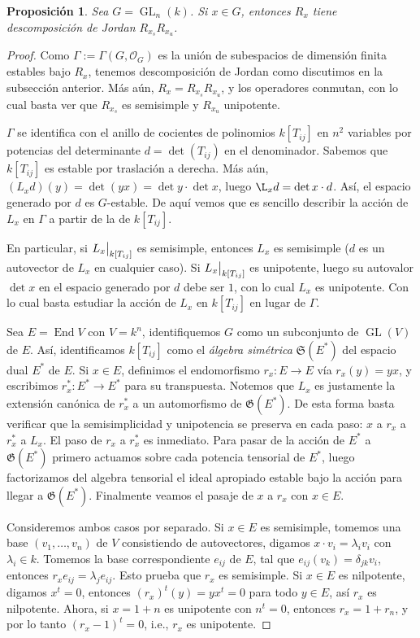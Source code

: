 \documentclass[spanish,10pt]{amsart}
\newtheorem{proposition}[theorem]{Proposición}
\theoremstyle{definition}
\theoremstyle{remark}
\numberwithin{equation}{section}
\newcommand\rest[2]{{%
  \left.\kern-\nulldelimiterspace %
  #1 %
  \vphantom{\big|} %
  \right|_{#2} %
  }}
\renewcommand{\O}{\mathcal{O}}
\begin{document}
\begin{proposition}
Sea $G = \operatorname{GL}_n (k)$. Si $x \in G$, entonces $R_x$ tiene descomposición de Jordan $R_{x_s} R_{x_u}$.
\end{proposition}

\begin{proof}
Como $\Gamma := \Gamma (G, \O_G)$ es la unión de subespacios de dimensión finita estables bajo $R_x$, tenemos descomposición de Jordan como discutimos en la subsección anterior. Más aún, $R_x = R_{x_s} R_{x_u}$, y los operadores conmutan, con lo cual basta ver que $R_{x_s}$ es semisimple y $R_{x_u}$ unipotente.

$\Gamma$ se identifica con el anillo de cocientes de polinomios $k[T_{ij}]$ en $n^2$ variables por potencias del determinante $d = \det (T_{ij})$ en el denominador. Sabemos que $k[T_{ij}]$ es estable por traslación a derecha. Más aún, $(L_x d) (y) = \det (y x) = \det y \cdot \det x$, luego $\L_x d = \det x \cdot d$. Así, el espacio generado por $d$ es $G$-estable. De aquí vemos que es sencillo describir la acción de $L_x$ en $\Gamma$ a partir de la de $k[T_{ij}]$.

En particular, si $\rest{L_x}{k[T_{ij}]}$ es semisimple, entonces $L_x$ es semisimple ($d$ es un autovector de $L_x$ en cualquier caso). Si $\rest{L_x}{k[T_{ij}]}$ es unipotente, luego su autovalor $\det x$ en el espacio generado por $d$ debe ser $1$, con lo cual $L_x$ es unipotente. Con lo cual basta estudiar la acción de $L_x$ en $k[T_{ij}]$ en lugar de $\Gamma$.

Sea $E = \operatorname{End} V$ con $V = k^n$, identifiquemos $G$ como un subconjunto de $\operatorname{GL}(V)$ de $E$. Así, identificamos $k[T_{ij}]$ como el \textit{álgebra simétrica} $\mathfrak S (E^*)$ del espacio dual $E^*$ de $E$. Si $x \in E$, definimos el endomorfismo $r_x : E \to E$ vía $r_{x} (y) = y x$, y escribimos $r_x^* : E^* \to E^*$ para su transpuesta. Notemos que $L_x$ es justamente la extensión canónica de $r_x^*$ a un automorfismo de $\mathfrak G (E^*)$. De esta forma basta verificar que la semisimplicidad y unipotencia se preserva en cada paso: $x$ a $r_x$ a $r_x^*$ a $L_x$. El paso de $r_x$ a $r_x^*$ es inmediato. Para pasar de la acción de $E^*$ a $\mathfrak G (E^*)$ primero actuamos sobre cada potencia tensorial de $E^*$, luego factorizamos del algebra tensorial el ideal apropiado estable bajo la acción para llegar a $\mathfrak G (E^*)$. Finalmente veamos el pasaje de $x$ a $r_x$ con $x \in E$.

Consideremos ambos casos por separado. Si $ x\in E$ es semisimple, tomemos una base $(v_1, \ldots, v_n)$ de $V$ consistiendo de autovectores, digamos $x \cdot v_i = \lambda_i v_i$ con $\lambda_i \in k$. Tomemos la base correspondiente $e_{ij}$ de $E$, tal que $e_{ij} (v_k) = \delta_{jk} v_i$, entonces $r_x e_{ij} = \lambda_j e_{ij}$. Esto prueba que $r_x$ es semisimple. Si $x \in E$ es nilpotente, digamos $x^t = 0$, entonces $(r_x)^t (y) = y x^t = 0$ para todo $y \in E$, así $r_x$ es nilpotente. Ahora, si $x = 1 + n$ es unipotente con $n^t = 0$, entonces $r_x = 1 + r_n$, y por lo tanto $(r_x - 1)^t = 0$, i.e., $r_x $ es unipotente.
\end{proof}
\end{document}
